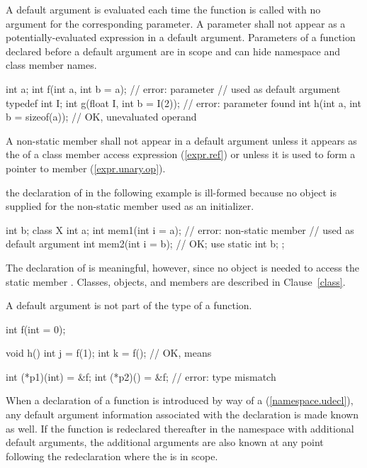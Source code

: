 \pnum
{}%
A default argument is evaluated each time the function is called
with no argument for the corresponding parameter.
%
A parameter shall not appear as a potentially-evaluated expression
in a default argument.
%
Parameters of a function declared before a default argument
are in scope and can hide namespace and class member names.
\begin{example}

\begin{codeblock}
int a;
int f(int a, int b = a);            // error: parameter 
                                    // used as default argument
typedef int I;
int g(float I, int b = I(2));       // error: parameter  found
int h(int a, int b = sizeof(a));    // OK, unevaluated operand
\end{codeblock}
\end{example}
A non-static member shall not appear in a default argument unless it appears as
the  of a class member access expression (\ref{expr.ref}) or
unless it is used to form a pointer to member (\ref{expr.unary.op}).
\begin{example}
the declaration of
in the following example is ill-formed because no object is supplied for the
non-static member
used as an initializer.

\begin{codeblock}
int b;
class X {
  int a;
  int mem1(int i = a);          // error: non-static member 
                                // used as default argument
  int mem2(int i = b);          // OK;  use 
  static int b;
};
\end{codeblock}

The declaration of
is meaningful, however, since no object is needed to access the static member
.
Classes, objects, and members are described in Clause~\ref{class}.
\end{example}
A default argument is not part of the
type of a function.
\begin{example}

\begin{codeblock}
int f(int = 0);

void h() {
  int j = f(1);
  int k = f();                  // OK, means 
}

int (*p1)(int) = &f;
int (*p2)() = &f;               // error: type mismatch
\end{codeblock}
\end{example}
When a declaration of a function is introduced by way of a
(\ref{namespace.udecl}), any default argument information associated
with the declaration is made known as well.
If the function is redeclared
thereafter in the namespace with additional default arguments,
the additional arguments are also known at any point following
the redeclaration where the
is in scope.

